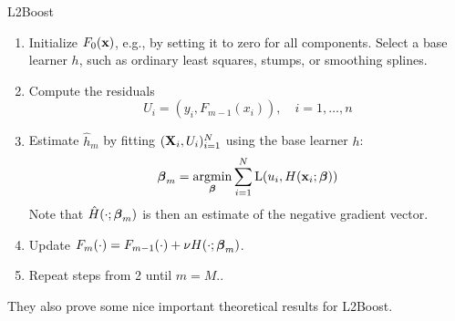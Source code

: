 \begin{algorithm}
\caption{L2Boost}
\label{algo:l2}
\begin{enumerate}
    \item Initialize $F_0(\mathbf{x})$, e.g., by setting it to zero for all components. Select a base learner $h$, such as ordinary least squares, stumps, or smoothing splines.
    \item Compute the residuals
        \begin{equation*}
            U_i=(y_i,F_{m-1}(x_i)),\quad i=1,\dotsc,n
        \end{equation*}
    \item Estimate $\hat{h}_m$ by fitting $(\mathbf{X}_i,U_i)_{i=1}^N$ using the base learner $h$:
        \begin{equation*}
            \boldsymbol{\beta}_m=\operatorname*{argmin}_{\boldsymbol{\beta}}\sum_{i=1}^N\operatorname{L}(u_i,H(\mathbf{x}_i;\boldsymbol{\beta}))
        \end{equation*}
        Note that $\hat{H}(\cdot;\boldsymbol{\beta}_m)$ is then an estimate of the negative gradient vector.
    \item Update $F_m(\cdot)=F_{m-1}(\cdot)+\nu H(\cdot;\boldsymbol{\beta}_m)$.
    \item Repeat steps from 2 until $m=M$..
\end{enumerate}
\end{algorithm}
They also prove some nice important theoretical results for L2Boost.



